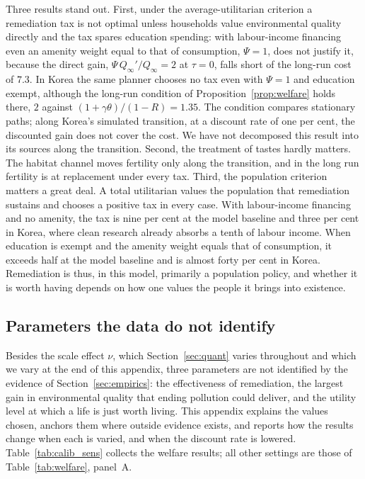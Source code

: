 \documentclass[11pt]{article}
\begin{document}
Three results stand out. First, under the average-utilitarian criterion a remediation tax is not optimal
unless households value environmental quality directly and the tax spares education spending: with
labour-income financing even an amenity weight equal to that of consumption, $\Psi=1$, does not justify
it, because the direct gain, $\Psi\,Q_\infty'/Q_\infty=2$ at $\tau=0$, falls short of the long-run cost of
$7.3$. In Korea the same planner chooses no tax even with $\Psi=1$ and education exempt, although the long-run
condition of Proposition~\ref{prop:welfare} holds there, $2$ against $(1+\gamma\theta)/(1-R)=1.35$. The condition compares
stationary paths; along Korea's simulated transition, at a discount rate of one per cent, the discounted
gain does not cover the cost. We have not decomposed this result into its sources along the
transition. Second, the treatment of tastes hardly matters. The habitat channel moves fertility only along the
transition, and in the long run fertility is at replacement under every tax. Third, the population
criterion matters a great deal. A total utilitarian values the population that remediation sustains and
chooses a positive tax in every case. With labour-income financing and no amenity, the tax is nine per
cent at the model baseline and three per cent in Korea, where clean research already absorbs a tenth of
labour income. When education is exempt and the amenity weight equals that of consumption, it exceeds half at the
model baseline and is almost forty per cent in Korea. Remediation is thus, in this model, primarily a
population policy, and whether it is worth having depends on how one values the people it brings into
existence.

\subsection{Parameters the data do not identify}
\label{app:calib}

Besides the scale effect $\nu$, which Section~\ref{sec:quant} varies throughout and which we vary at the
end of this appendix, three parameters are not identified by the evidence of Section~\ref{sec:empirics}: the effectiveness of remediation, the largest gain in environmental quality
that ending pollution could deliver, and the utility level at which a life is just worth living. This
appendix explains the values chosen, anchors them where outside evidence exists, and reports how the
results change when each is varied, and when the discount rate is lowered. Table~\ref{tab:calib_sens} collects the welfare results; all other
settings are those of Table~\ref{tab:welfare}, panel~A.
\end{document}
